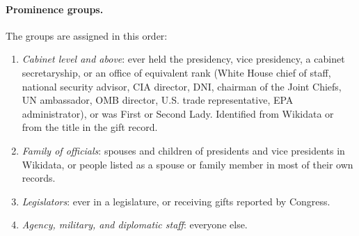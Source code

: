 \documentclass[11pt]{article}
\begin{document}
\paragraph{Prominence groups.} The groups are assigned in this order:
\begin{enumerate}
\item \emph{Cabinet level and above}: ever held the presidency, vice presidency, a cabinet secretaryship, or an office of equivalent rank (White House chief of staff, national security advisor, CIA director, DNI, chairman of the Joint Chiefs, UN ambassador, OMB director, U.S. trade representative, EPA administrator), or was First or Second Lady. Identified from Wikidata or from the title in the gift record.
\item \emph{Family of officials}: spouses and children of presidents and vice presidents in Wikidata, or people listed as a spouse or family member in most of their own records.
\item \emph{Legislators}: ever in a legislature, or receiving gifts reported by Congress.
\item \emph{Agency, military, and diplomatic staff}: everyone else.
\end{enumerate}
\end{document}
